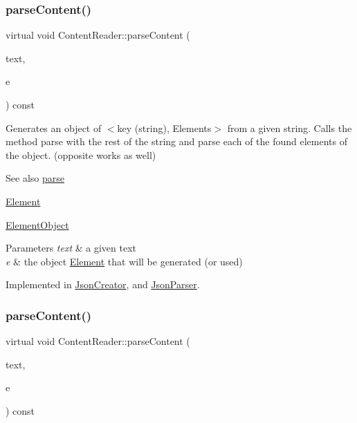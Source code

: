 \subsubsection{\texorpdfstring{parse\+Content()}{parseContent()}\hspace{0.1cm}{\footnotesize\ttfamily [5/6]}}
{\footnotesize\ttfamily virtual void Content\+Reader\+::parse\+Content (\begin{DoxyParamCaption}\item[{std\+::string \&}]{text,  }\item[{\mbox{\hyperlink{classElementObject}{Element\+Object}} $\ast$}]{e }\end{DoxyParamCaption}) const\hspace{0.3cm}{\ttfamily [pure virtual]}}

Generates an object of $<$key (string), Elements$>$ from a given string. Calls the method parse with the rest of the string and parse each of the found elements of the object. (opposite works as well) \begin{DoxySeeAlso}{See also}
\mbox{\hyperlink{classContentReader_a7fff2e63a2e8fa216665604f69974e1d}{parse}} 

\mbox{\hyperlink{classElement}{Element}} 

\mbox{\hyperlink{classElementObject}{Element\+Object}}
\end{DoxySeeAlso}

\begin{DoxyParams}{Parameters}
{\em text} & a given text \\
\hline
{\em e} & the object \mbox{\hyperlink{classElement}{Element}} that will be generated (or used) \\
\hline
\end{DoxyParams}


Implemented in \mbox{\hyperlink{classJsonCreator_a9f57af1a7925074b8e3e4175f74c886a}{Json\+Creator}}, and \mbox{\hyperlink{classJsonParser_a7d4fad0f0947a74ca158dc1922c97355}{Json\+Parser}}.

\mbox{\label{classContentReader_ab4ba739ee5241848ae8af86e64e43a40}} 
\subsubsection{\texorpdfstring{parse\+Content()}{parseContent()}\hspace{0.1cm}{\footnotesize\ttfamily [6/6]}}
{\footnotesize\ttfamily virtual void Content\+Reader\+::parse\+Content (\begin{DoxyParamCaption}\item[{std\+::string \&}]{text,  }\item[{\mbox{\hyperlink{classElementDouble}{Element\+Double}} $\ast$}]{e }\end{DoxyParamCaption}) const\hspace{0.3cm}{\ttfamily [pure virtual]}}

